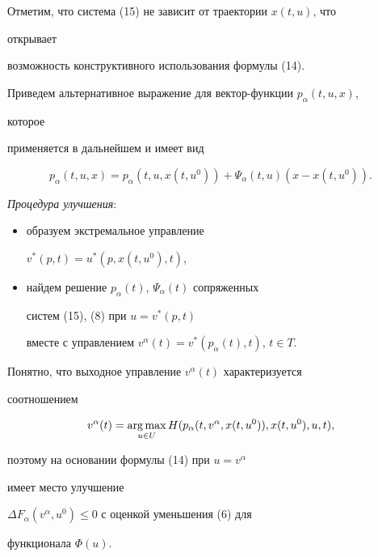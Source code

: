 Отметим, что система (15) не зависит от траектории $x(t,u)$, что 


открывает 


возможность конструктивного использования формулы (14). 


 


Приведем альтернативное выражение для вектор-функции $p_\alpha(t,u,x)$, 


которое 


применяется в дальнейшем и имеет вид 


\begin{equation} 


p_\alpha(t,u,x)=p_\alpha(t,u,x(t,u^0))+\Psi_\alpha(t,u) 


(x-x(t,u^0)). 


\end{equation} 


 


{\it Процедура улучшения}: 


\begin{itemize} 


\item[1)] образуем экстремальное управление 


$v^*(p,t)=u^*(p,x(t,u^0),t)$, 


\item[2)] найдем решение $p_\alpha(t)$, $\Psi_\alpha(t)$ сопряженных 


систем (15), (8) при $u=v^*(p,t)$ 


вместе с управлением $v^\alpha(t)=v^*(p_\alpha(t),t)$, $t\in T$. 


\end{itemize} 


Понятно, что выходное управление $v^\alpha(t)$ характеризуется 


соотношением 


$$ 


v^\alpha(t)=\argmax_{u\in U} 


H(p_\alpha(t,v^\alpha,x(t,u^0)),x(t,u^0),u,t), 


$$ 


поэтому на основании формулы (14) при $u=v^\alpha$ 


имеет место улучшение 


$\Delta F_\alpha(v^\alpha,u^0)\le 0$ с оценкой уменьшения (6) для 


функционала $\Phi(u)$. 


